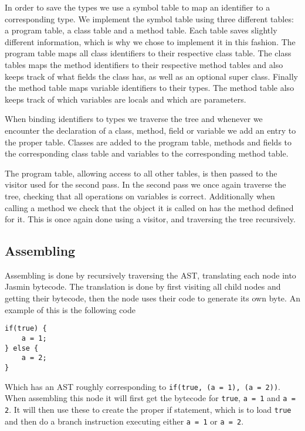 \documentclass[a4paper]{article}
\begin{document}
In order to save the types we use a symbol table to map an identifier to a
corresponding type. We implement the symbol table using three different
tables: a program table, a class table and a method table. Each table saves
slightly different information, which is why we chose to implement it in this
fashion. The program table maps all class identifiers to their respective class
table. The class tables maps the method identifiers to their respective method
tables and also keeps track of what fields the class has, as well as an optional
super class. Finally the method table maps variable identifiers to their types.
The method table also keeps track of which variables are locals and which are
parameters.

When binding identifiers to types we traverse the tree and whenever we encounter
the declaration of a class, method, field or variable we add an entry to the
proper table. Classes are added to the program table, methods and fields to the
corresponding class table and variables to the corresponding method table.

The program table, allowing access to all other tables, is then passed to the
visitor used for the second pass. In the second pass we once again traverse the
tree, checking that all operations on variables is correct. Additionally when
calling a method we check that the object it is called on has the method defined
for it. This is once again done using a visitor, and traversing the tree
recursively.

\subsection{Assembling}

Assembling is done by recursively traversing the AST, translating each node into Jasmin
bytecode. The translation is done by first visiting all child nodes and getting their
bytecode, then the node uses their code to generate its own byte. An example of
this is the following code

\begin{lstlisting}
if(true) {
    a = 1;
} else {
    a = 2;
}
\end{lstlisting}

Which has an AST  roughly corresponding to \texttt{if(true, (a = 1), (a = 2))}.
When assembling this node it will first get the bytecode for \texttt{true}, \texttt{a = 1}
and \texttt{a = 2}. It will then use these to create the proper if statement, which is
to load \texttt{true} and then do a branch instruction executing either \texttt{a = 1} or
\texttt{a = 2}.
\end{document}
